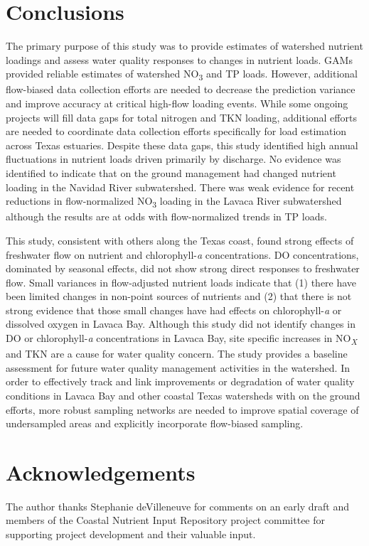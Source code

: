 \documentclass[fleqn,10pt,lineno]{wlpeerj} %
\providecommand{\DIFaddtex}[1]{{\protect\color{blue}\uwave{#1}}} %
\providecommand{\DIFaddbegin}{} %
\providecommand{\DIFaddend}{} %
\providecommand{\DIFadd}[1]{\texorpdfstring{\DIFaddtex{#1}}{#1}} %
\begin{document}
\hypertarget{conclusions}{%
\section*{Conclusions}\label{conclusions}}

The primary purpose of this study was to provide estimates of watershed
nutrient loadings and assess water quality responses to changes in
nutrient loads. GAMs provided reliable estimates of watershed
NO\textsubscript{3} and TP loads. However, additional flow-biased data
collection efforts are needed to decrease the prediction variance and
improve accuracy at critical high-flow loading events. While some
ongoing projects will fill data gaps for total nitrogen and TKN loading,
additional efforts are needed to coordinate data collection efforts
specifically for load estimation across Texas estuaries. Despite these
data gaps, this study identified high annual fluctuations in nutrient
loads driven primarily by discharge. No evidence was identified to
indicate that on the ground management had changed nutrient loading in
the Navidad River subwatershed. There was weak evidence for recent
reductions in flow-normalized NO\textsubscript{3} loading in the Lavaca
River subwatershed although the results are at odds with flow-normalized
trends in TP loads.

This study, consistent with others along the Texas coast, found strong
effects of freshwater flow on nutrient and chlorophyll-\emph{a}
concentrations. DO concentrations, dominated by seasonal effects, did
not show strong direct responses to freshwater flow. Small variances in
flow-adjusted nutrient loads indicate that (1) there have been limited
changes in non-point sources of nutrients and (2) that there is not
strong evidence that those small changes have had \DIFaddbegin \DIFadd{extensive }\DIFaddend effects on
chlorophyll-\emph{a} or dissolved oxygen in Lavaca Bay. Although this
study did not identify changes in DO or chlorophyll-\emph{a}
concentrations in Lavaca Bay, site specific increases in
NO\textsubscript{\emph{X}} and TKN are a cause for water quality
concern. The study provides a baseline assessment for future water
quality management activities in the watershed. In order to effectively
track and link improvements or degradation of water quality conditions
in Lavaca Bay and other coastal Texas watersheds with on the ground
efforts, more robust sampling networks are needed to improve spatial
coverage of undersampled areas and explicitly incorporate flow-biased
sampling.

\hypertarget{acknowledgements}{%
\section*{Acknowledgements}\label{acknowledgements}}

The author thanks Stephanie deVilleneuve for comments on an early draft
and members of the Coastal Nutrient Input Repository project committee
for supporting project development and their valuable input.

\printbibliography
\end{document}
